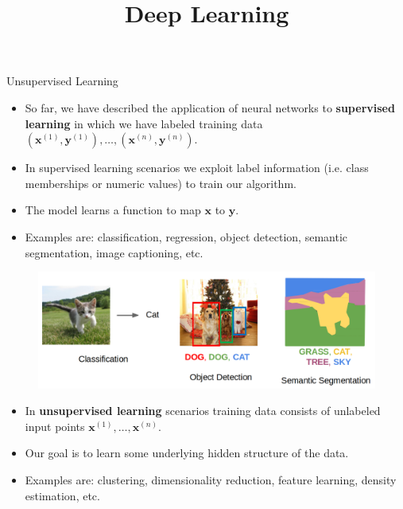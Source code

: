 




\title{Deep Learning}
\date{}


\newcommand{\titlefigure}{plots/unsupervised_3.png}
\newcommand{\learninggoals}{
  \item Unsupervised learning tasks
  \item Unsupervised deep learning
}




\begin{vbframe}{Unsupervised Learning}
  \begin{itemize}
    \item So far, we have described the application of neural networks to %
     \textbf{supervised learning}  in which we have labeled training data $(\pmb{x}^{(1)}, \pmb{y}^{(1)}), \dots, (\pmb{x}^{(n)}, \pmb{y}^{(n)})$.
    \item In supervised learning scenarios
   we exploit label information (i.e. class memberships or numeric values) to train our algorithm. %
    \item%
    The model learns a function to map $\pmb{x}$ to $\pmb{y}$.
    \item Examples are: classification, regression, object detection, semantic segmentation, image captioning, etc.
  \end{itemize}
    
        \begin{figure}
            \centering
            \includegraphics[width=0.6\linewidth]{plots/supervised.png}
        \end{figure}
    
    \framebreak
    
    \begin{itemize}
      \item In \textbf{unsupervised learning} scenarios
      training data consists of unlabeled input points $\pmb{x}^{(1)}, \dots, \pmb{x}^{(n)}$.
      \item Our goal is to learn some underlying hidden structure of the data.
      \item Examples are: clustering, dimensionality reduction, feature learning, density estimation, etc.
    \end{itemize}

\end{vbframe}

